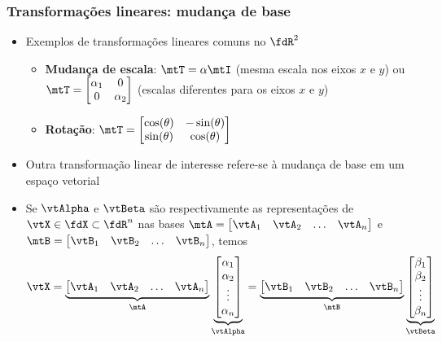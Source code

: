 \begin{frame}
  \frametitle{Transformações lineares: mudança de base}
  \begin{itemize}
    \item Exemplos de transformações lineares comuns no $\fdR^2$
    \begin{itemize}
      \item \textbf{Mudança de escala}: $\mtT = \alpha\mtI$ (mesma escala nos eixos $x$ e $y$) ou $\mtT = \left[\begin{matrix}\alpha_1 & 0 \\ 0 & \alpha_2 \end{matrix}\right]$ (escalas diferentes para os eixos $x$ e $y$)
      \item \textbf{Rotação}: $\mtT = \left[\begin{matrix}\cos(\theta) & -\sin(\theta) \\ \sin(\theta) & \cos(\theta) \end{matrix}\right]$
    \end{itemize}
    \item Outra transformação linear de interesse refere-se à mudança de base em um espaço vetorial
    \item Se $\vtAlpha$ e $\vtBeta$ são respectivamente as representações de $\vtX \in \fdX \subset \fdR^n$ nas bases $\mtA = \left[\begin{matrix}\vtA_1 & \vtA_2 & \ldots & \vtA_n\end{matrix}\right]$ e $\mtB = \left[\begin{matrix}\vtB_1 & \vtB_2 & \ldots & \vtB_n\end{matrix}\right]$, temos
    \begin{equation}\label{eq_base_change}
      \vtX = \underbrace{\left[\begin{matrix}\vtA_1 & \vtA_2 & \ldots & \vtA_n\end{matrix}\right]}_{\mtA}\underbrace{\left[\begin{matrix}\alpha_1 \\ \alpha_2 \\ \vdots \\ \alpha_n\end{matrix}\right]}_{\vtAlpha} = \underbrace{\left[\begin{matrix}\vtB_1 & \vtB_2 & \ldots & \vtB_n\end{matrix}\right]}_{\mtB}\underbrace{\left[\begin{matrix}\beta_1 \\ \beta_2 \\ \vdots \\ \beta_n\end{matrix}\right]}_{\vtBeta}
    \end{equation}
  \end{itemize}
\end{frame}

